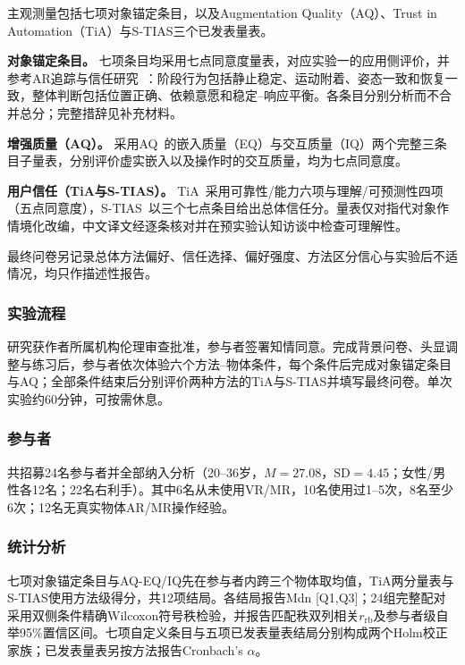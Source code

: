 \documentclass[review]{vgtc}
\begin{document}
主观测量包括七项对象锚定条目，以及Augmentation Quality（AQ）、Trust in Automation（TiA）与S-TIAS三个已发表量表。

\textbf{对象锚定条目。}
七项条目均采用七点同意度量表，对应实验一的应用侧评价，并参考AR追踪与信任研究~\cite{trustar2024}：阶段行为包括静止稳定、运动附着、姿态一致和恢复一致，整体判断包括位置正确、依赖意愿和稳定--响应平衡。各条目分别分析而不合并总分；完整措辞见补充材料。


\textbf{增强质量（AQ）。}
采用AQ~\cite{aq2026}的嵌入质量（EQ）与交互质量（IQ）两个完整三条目子量表，分别评价虚实嵌入以及操作时的交互质量，均为七点同意度。

\textbf{用户信任（TiA与S-TIAS）。}
TiA~\cite{tia2019}采用可靠性/能力六项与理解/可预测性四项（五点同意度），S-TIAS~\cite{stias2025}以三个七点条目给出总体信任分。量表仅对指代对象作情境化改编，中文译文经逐条核对并在预实验认知访谈中检查可理解性。

最终问卷另记录总体方法偏好、信任选择、偏好强度、方法区分信心与实验后不适情况，均只作描述性报告。

\subsubsection{实验流程}

研究获作者所属机构伦理审查批准，参与者签署知情同意。完成背景问卷、头显调整与练习后，参与者依次体验六个方法--物体条件，每个条件后完成对象锚定条目与AQ；全部条件结束后分别评价两种方法的TiA与S-TIAS并填写最终问卷。单次实验约60分钟，可按需休息。

\subsubsection{参与者}

共招募24名参与者并全部纳入分析（20--36岁，$M=27.08$，$\mathrm{SD}=4.45$；女性/男性各12名；22名右利手）。其中6名从未使用VR/MR，10名使用过1--5次，8名至少6次；12名无真实物体AR/MR操作经验。

\subsubsection{统计分析}

七项对象锚定条目与AQ-EQ/IQ先在参与者内跨三个物体取均值，TiA两分量表与S-TIAS使用方法级得分，共12项结局。各结局报告Mdn [Q1,Q3]；24组完整配对采用双侧条件精确Wilcoxon符号秩检验，并报告匹配秩双列相关$r_{\mathrm{rb}}$及参与者级自举95\%置信区间。七项自定义条目与五项已发表量表结局分别构成两个Holm校正家族；已发表量表另按方法报告Cronbach's $\alpha$。
\end{document}
